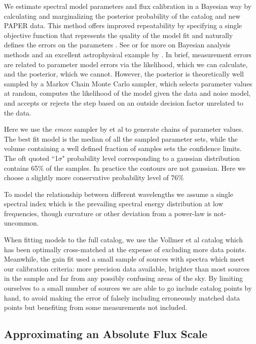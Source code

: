 \documentclass[preprint]{aastex}
\begin{document}
We estimate spectral model parameters and flux calibration in a
Bayesian way by calculating and marginalizing the posterior probability of the
catalog and new PAPER data.   This method
offers improved repeatability by specifying a single objective function that
represents the quality of the model fit and naturally defines the errors on the
parameters \citep{Hogg:2010p8759}.   See  \citet{Mackay:2003p9717}  or
\citet{Sivia:2006p9736} for more on Bayesian analysis methods and an excellent
astrophysical example by \cite{Press:1997p9783}. In brief, measurement errors
are related to parameter model errors via the likelihood, which we can calculate, 
and the posterior, which we cannot.  However, the posterior is theoretically
well sampled by a Markov Chain Monte Carlo sampler, which selects parameter
values at random, computes the likelihood of the model given the data and noise model,
and accepts or rejects the step based on an outside decision factor unrelated to the data.


Here we use the \emph{emcee} sampler by \citet{Mackay:2003p9717} et al to generate chains of
parameter values. The best fit model is the median of all the sampled
parameter sets, while the volume containing a well defined fraction of samples
sets the confidence limits.  The oft quoted ``1$\sigma$" probability level
corresponding to a gaussian distribution contains 65\% of the samples. In
practice the contours are not gaussian. Here we choose a slightly more
conservative probability level of 76\% 


To model the relationship between different wavelengths we assume a single spectral index
which is the prevailing spectral energy distribution at low frequencies, 
though curvature or other
deviation from a power-law is not-uncommon.  

When fitting models to the full catalog, we use the Vollmer et al
catalog which has been optimally cross-matched at the expense of excluding more data points.
Meanwhile, the gain fit used a small sample of
sources with spectra which meet our calibration criteria: more precision data available,
brighter than most sources in the sample and far from any possibly confusing areas of
the sky. 
By limiting ourselves to a small number of sources we are able to go include catalog points by hand,
to avoid making the error of falsely including erroneously matched 
data points but benefiting from some measurements not included. 


\subsection{Approximating an Absolute Flux Scale}
\label{sec:flux_scale}
\end{document}

